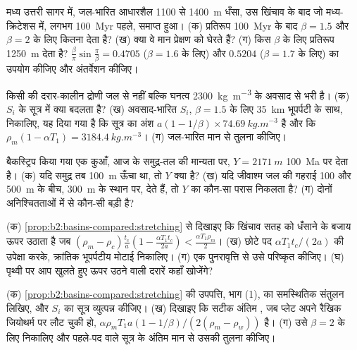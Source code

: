 \begin{exercise}[$\star\star$]\label{exo:b2:basins-compared:7}
मध्य उत्तरी सागर में, जल-भारित आधारशैल 1100 से \qty{1400}{m} धँसा, उस
खिंचाव के बाद जो मध्य-क्रिटेशस में, लगभग \qty{100}{Myr} पहले, समाप्त हुआ। (क) प्रतिरूप \qty{100}{Myr} के बाद
$\beta = 1.5$ और $\beta = 2$ के लिए कितना  देता है? (ख) क्या
वे मान प्रेक्षण को घेरते हैं? (ग) किस $\beta$ के लिए प्रतिरूप \qty{1250}{m} देता है?
$\frac{\beta}{\pi}\sin\frac{\pi}{\beta} = 0.4705$ ($\beta = 1.6$ के लिए) और $0.5204$ ($\beta
= 1.7$ के लिए) का उपयोग कीजिए और अंतर्वेशन कीजिए।
\end{exercise}

\begin{exercise}[$\star\star$]\label{exo:b2:basins-compared:8}
किसी  की दरार-कालीन द्रोणी जल से नहीं बल्कि घनत्व \qty{2300}{kg.m^{-3}}
के अवसाद से भरी है। (क) $S_i$ के सूत्र में क्या बदलता है? (ख) अवसाद-भारित $S_i$, $\beta = 1.5$ के लिए
\qty{35}{km} भूपर्पटी के साथ, निकालिए, यह दिया गया है कि सूत्र का अंश
$a(1 - 1/\beta)\times\qty{74.69}{kg.m^{-3}}$ है और कि $\rho_m(1 - \alpha T_1) =
\qty{3184.4}{kg.m^{-3}}$। (ग) जल-भारित मान से तुलना कीजिए।
\end{exercise}

\begin{exercise}[$\star\star$]\label{exo:b2:basins-compared:9}
बैकस्ट्रिप किया गया एक कुआँ, आज के समुद्र-तल की मान्यता पर, $Y = \qty{2171}{m}$ \qty{100}{Ma} पर देता है। (क)
यदि समुद्र तब \qty{100}{m} ऊँचा था, तो $Y$ क्या है? (ख) यदि जीवाश्म जल की गहराई
100 और \qty{500}{m} के बीच, \qty{300}{m} के स्थान पर, देते हैं, तो $Y$ का कौन-सा परास निकलता है? (ग) दोनों
अनिश्चितताओं में से कौन-सी बड़ी है?
\end{exercise}

\begin{exercise}[$\star\star\star$]\label{exo:b2:basins-compared:10}
(क) \cref{prop:b2:basins-compared:stretching} से दिखाइए कि खिंचाव सतह को धँसाने के बजाय
ऊपर उठाता है जब $(\rho_m - \rho_c)\frac{t_c}{a}\left(1 - \frac{\alpha T_1 t_c}{2a}\right) <
\frac{\alpha T_1\rho_m}{2}$। (ख) छोटे पद $\alpha T_1 t_c/(2a)$ की उपेक्षा करके,
क्रांतिक भूपर्पटीय मोटाई निकालिए। (ग) एक पुनरावृत्ति से उसे परिष्कृत कीजिए। (घ) पृथ्वी पर आप
खुलते हुए ऊपर उठने वाली दरारें कहाँ खोजेंगे?
\end{exercise}

\begin{exercise}[$\star\star\star$]\label{exo:b2:basins-compared:11}
(क) \cref{prop:b2:basins-compared:stretching} की उपपत्ति, भाग (1), का समस्थितिक संतुलन लिखिए,
और $S_i$ का सूत्र व्युत्पन्न कीजिए। (ख) दिखाइए कि सटीक अंतिम , जब
प्लेट अपने रैखिक जियोथर्म पर लौट चुकी हो, $\alpha\rho_m T_1 a(1 - 1/\beta)/(2(\rho_m -
\rho_w))$ है। (ग) उसे $\beta = 2$ के लिए निकालिए और पहले-पद वाले सूत्र के अंतिम मान से
उसकी तुलना कीजिए।
\end{exercise}

